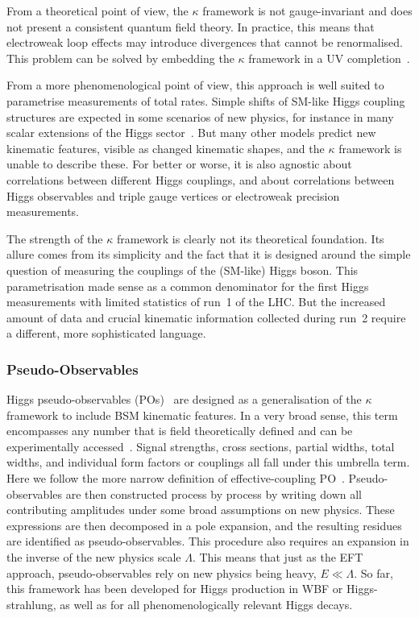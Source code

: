 From a theoretical point of view, the $\kappa$ framework is not
gauge-invariant and does not present a consistent quantum field
theory. In practice, this means that electroweak loop effects may
introduce divergences that cannot be renormalised.~
This problem can be solved by embedding the $\kappa$ framework in a UV
completion~\cite{Lopez-Val:2013yba}.

From a more phenomenological point of view, this approach is well
suited to parametrise measurements of total rates. Simple shifts of
SM-like Higgs coupling structures are expected in some scenarios of
new physics, for instance in many scalar extensions of the Higgs
sector~\cite{Lopez-Val:2013yba}. But many other models predict new
kinematic features, visible as changed kinematic shapes, and the
$\kappa$ framework is unable to describe these. For better or worse,
it is also agnostic about correlations between different Higgs
couplings, and about correlations between Higgs observables and triple
gauge vertices or electroweak precision measurements.

The strength of the $\kappa$ framework is clearly not its theoretical
foundation. Its allure comes from its simplicity and the fact that it
is designed around the simple question of measuring the couplings of
the (SM-like) Higgs boson. This parametrisation made sense as a
common denominator for the first Higgs measurements with limited
statistics of run~1 of the LHC. But the increased amount of data and
crucial kinematic information collected during run~2 require a
different, more sophisticated language.



\subsubsection{Pseudo-Observables}

Higgs pseudo-observables (POs)~\cite{Isidori:2013cga, Bordone:2015nqa,
  Greljo:2015sla} are designed as a generalisation of the $\kappa$
framework to include BSM kinematic features. In a very broad sense,
this term encompasses any number that is field theoretically defined
and can be experimentally accessed~\cite{Krause:2016uhw}. Signal
strengths, cross sections, partial widths, total widths, and
individual form factors or couplings all fall under this umbrella
term. Here we follow the more narrow definition of effective-coupling
PO~\cite{deFlorian:2016spz}. Pseudo-observables are then constructed
process by process by writing down all contributing amplitudes under
some broad assumptions on new physics. These expressions are then
decomposed in a pole expansion, and the resulting residues are
identified as pseudo-observables. This procedure also requires an
expansion in the inverse of the new physics scale $\Lambda$. This
means that just as the EFT approach, pseudo-observables rely on new
physics being heavy, $E \ll \Lambda$. So far, this framework has been
developed for Higgs production in WBF or Higgs-strahlung, as well as
for all phenomenologically relevant Higgs decays.

